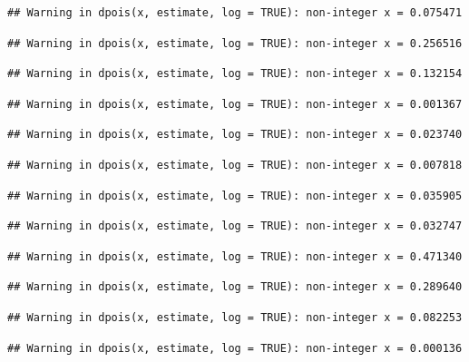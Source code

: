 \documentclass[]{article}
\begin{document}
\begin{verbatim}
## Warning in dpois(x, estimate, log = TRUE): non-integer x = 0.075471
\end{verbatim}

\begin{verbatim}
## Warning in dpois(x, estimate, log = TRUE): non-integer x = 0.256516
\end{verbatim}

\begin{verbatim}
## Warning in dpois(x, estimate, log = TRUE): non-integer x = 0.132154
\end{verbatim}

\begin{verbatim}
## Warning in dpois(x, estimate, log = TRUE): non-integer x = 0.001367
\end{verbatim}

\begin{verbatim}
## Warning in dpois(x, estimate, log = TRUE): non-integer x = 0.023740
\end{verbatim}

\begin{verbatim}
## Warning in dpois(x, estimate, log = TRUE): non-integer x = 0.007818
\end{verbatim}

\begin{verbatim}
## Warning in dpois(x, estimate, log = TRUE): non-integer x = 0.035905
\end{verbatim}

\begin{verbatim}
## Warning in dpois(x, estimate, log = TRUE): non-integer x = 0.032747
\end{verbatim}

\begin{verbatim}
## Warning in dpois(x, estimate, log = TRUE): non-integer x = 0.471340
\end{verbatim}

\begin{verbatim}
## Warning in dpois(x, estimate, log = TRUE): non-integer x = 0.289640
\end{verbatim}

\begin{verbatim}
## Warning in dpois(x, estimate, log = TRUE): non-integer x = 0.082253
\end{verbatim}

\begin{verbatim}
## Warning in dpois(x, estimate, log = TRUE): non-integer x = 0.000136
\end{verbatim}
\end{document}
